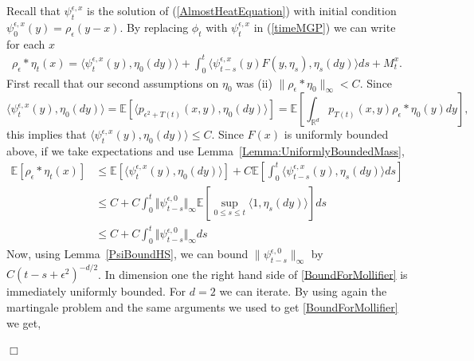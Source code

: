 \documentclass[12pt]{article}
\newenvironment {proof}{{\noindent\bf Proof }}{\hfill $\Box$ \medskip}
\newcommand{\IE}{\mathbb E}
\newcommand{\IR}{\mathbb R}
\newcommand{\comment}[1]{{\color{blue} \it #1}}
\begin{document}
\begin{proof}
    Recall that $\psi_t^{\epsilon,x}$ is the solution of (\ref{AlmostHeatEquation})
    with initial condition $\psi_0^{\epsilon,x}(y)=\rho_\epsilon(y-x)$.
    By replacing $\phi_t$ with $\psi_t^{\epsilon,x}$ in (\ref{timeMGP}) we can write
    for each $x$
    \begin{align}
            \label{MartingaleProblemMolifier}
        \rho_\epsilon*\eta_t(x)
        =
        \langle \psi_t^{\epsilon,x}(y), \eta_0(dy) \rangle
        +
        \int_0^t \langle
            \psi_{t-s}^{\epsilon,x}(y) F(y, \eta_s),
        \eta_s(dy) \rangle ds
        +
        M_t^x .
    \end{align}
    First recall that our second assumptions on $\eta_0$
    was (ii) $\|\rho_\epsilon * \eta_0\|_\infty < C$.
    Since 
    \[
        \langle \psi_t^{\epsilon,x}(y), \eta_0(dy) \rangle
        =
        \IE \left[ \langle
            p_{\epsilon^2 + T(t)}(x, y), \eta_0(dy)
        \rangle \right]
        =
        \IE \left[ \int_{\IR^d} p_{T(t)}(x, y) \rho_\epsilon * \eta_0(y) dy \right],
    \]
    this implies that
    $\langle \psi_t^{\epsilon,x}(y), \eta_0(dy) \rangle \le C$.
    Since $F(x)$ is uniformly bounded above,
    if we take expectations and use Lemma~\ref{Lemma:UniformlyBoundedMass},
    \begin{align}
    \IE[\rho_\epsilon * \eta_t(x)]
        &\le \label{BoundForMollifierStart}
        \IE[\langle \psi_t^{\epsilon,x}(y), \eta_0(dy) \rangle]
        +
        C \IE\left[\int_0^t \langle \psi_{t-s}^{\epsilon,x}(y), \eta_s(dy) \rangle ds\right]
        \\ & \nonumber
        \leq
        C
        +
        C \int_0^t \Vert \psi_{t-s}^{\epsilon,0} \Vert_\infty
        \IE\left[\sup_{0 \leq s \leq t} \langle 1, \eta_s(dy) \rangle\right] ds
        \\ &
        \leq \label{BoundForMollifier}
        C + C \int_0^t \Vert \psi_{t-s}^{\epsilon,0} \Vert_\infty ds
    \end{align}
    Now, using Lemma~\ref{PsiBoundHS}, %
    we can bound $\| \psi_{t-s}^{\epsilon,0} \|_\infty$
    by $C (t-s+\epsilon^2)^{-d/2}$.
    In dimension one the right hand side of \eqref{BoundForMollifier} is immediately uniformly bounded.
    For $d=2$ we can iterate.
    By using again the martingale problem and the same arguments
    we used to get \eqref{BoundForMollifier} we get,

\end{proof}
\end{document}
